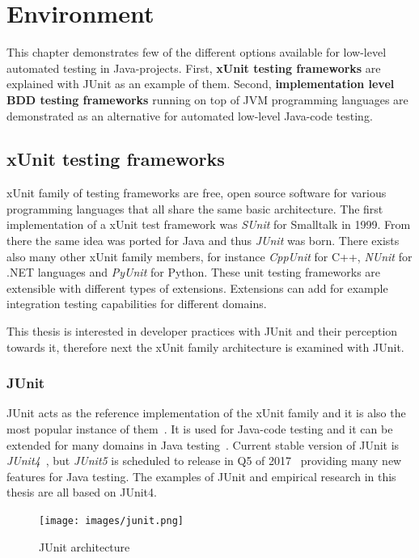 \chapter{Environment}
\label{chapter:environment}
This chapter demonstrates few of the different options available for low-level automated testing in Java-projects. First,
\textbf{xUnit testing frameworks} are explained with JUnit as an example of them. Second, \textbf{implementation level BDD testing frameworks}
running on top of JVM programming languages are demonstrated as an alternative for automated low-level Java-code testing.

\section{xUnit testing frameworks} %
    xUnit family of testing frameworks are free, open source software for various programming languages that
    all share the same basic architecture. The first implementation of a xUnit test framework was \textit{SUnit}
    for Smalltalk in 1999.  From there the same idea was ported for Java and thus \textit{JUnit} was born. There exists also many other
    xUnit family members, for instance \textit{CppUnit} for C++, \textit{NUnit} for .NET languages and \textit{PyUnit} for Python.
    These unit testing frameworks are extensible with different types of extensions. Extensions can add for example integration testing capabilities
    for different domains. ~\cite{hamill2004unit}

    This thesis is interested in developer practices with JUnit and their perception towards it, therefore next the xUnit family architecture
    is examined with JUnit.

    \subsection{JUnit}
    JUnit acts as the reference implementation of the xUnit family and it is also the most popular instance of them~\cite{hamill2004unit}.
    It is used for Java-code testing and it can be extended for many domains in Java testing~\cite{hamill2004unit}.
    Current stable version of JUnit is \textit{JUnit4}~\cite{junit4}, but \textit{JUnit5} is scheduled to release in Q5 of 2017~\cite{junit5schedule}
    providing many new features for Java testing. The examples of JUnit and empirical research in this thesis are all based on JUnit4.

    \begin{figure}[ht]
      \begin{center}
        \texttt{[image: images/junit.png]}
        \caption{JUnit architecture}
        \label{fig:junit}
      \end{center}
    \end{figure}

